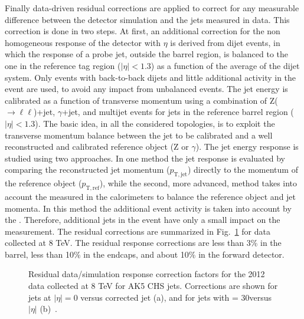 Finally data-driven residual corrections are applied to correct for any measurable difference between the detector simulation and the jets measured in data. 
This correction is done in two steps. At first, an additional correction for the non homogeneous response of the detector with $\eta$ is derived from dijet events, in which the \pt response of a probe jet, outside the barrel region, is balanced to the one in the reference tag region ($|\eta| < 1.3$) as a function of the average \pt of the dijet system. Only events with back-to-back dijets and little additional activity in the event are used, to avoid any impact from unbalanced events. %
The jet energy is calibrated as a function of transverse momentum using a combination of Z($\rightarrow\ell\ell$)+jet, $\gamma$+jet, and multijet events for jets in the reference barrel region ($|\eta| < 1.3$). The basic idea, in all the considered topologies, is to exploit the transverse momentum balance between the jet to be calibrated and a well reconstructed and calibrated reference object (Z or $\gamma$). The jet energy response is studied using two approaches. In one method the jet response is evaluated by comparing the reconstructed jet momentum ($p_\mathrm{T,jet}$) directly to the momentum of the reference object ($p_\mathrm{T,ref}$), while the second, more advanced, method takes into account the \Etmiss measured in the calorimeters to balance the reference object and jet momenta. In this method the additional event activity is taken into account by the \Etmiss. Therefore, additional jets in the event have only a small impact on the measurement. The residual corrections are summarized in Fig.~\ref{fig:rescorr_ak5chs} for data collected at 8 TeV. The residual response corrections are less than 3\% in the barrel, less than 10\% in the endcaps, and about 10\% in the forward detector.

\begin{figure}[!htb]
\centering
{}
\caption{Residual data/simulation response correction factors for the 2012 data collected at 8 TeV for AK5 CHS jets. Corrections are shown for jets at $|\eta| = 0$ versus corrected jet \pt (a), and for jets with \pt = 30\GeV versus $|\eta|$ (b)~\cite{Khachatryan:2016kdb}.}
\label{fig:rescorr_ak5chs}
\end{figure}

